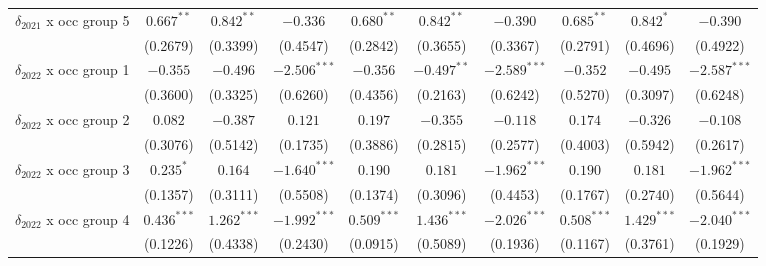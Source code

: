 \begin{tabular}{l|ccc|ccc|ccc|}
$\delta_{2021}$ x occ group 5          &            $0.667^{**}$ &    $0.842^{**}$ &        $-0.336$ &             $0.680^{**}$ &    $0.842^{**}$ &        $-0.390$ &             $0.685^{**}$ &       $0.842^*$ &        $-0.390$ \\
                                       &                (0.2679) &        (0.3399) &        (0.4547) &                 (0.2842) &        (0.3655) &        (0.3367) &                 (0.2791) &        (0.4696) &        (0.4922) \\
$\delta_{2022}$ x occ group 1          &                $-0.355$ &        $-0.496$ &  $-2.506^{***}$ &                 $-0.356$ &   $-0.497^{**}$ &  $-2.589^{***}$ &                 $-0.352$ &        $-0.495$ &  $-2.587^{***}$ \\
                                       &                (0.3600) &        (0.3325) &        (0.6260) &                 (0.4356) &        (0.2163) &        (0.6242) &                 (0.5270) &        (0.3097) &        (0.6248) \\
$\delta_{2022}$ x occ group 2          &                 $0.082$ &        $-0.387$ &         $0.121$ &                  $0.197$ &        $-0.355$ &        $-0.118$ &                  $0.174$ &        $-0.326$ &        $-0.108$ \\
                                       &                (0.3076) &        (0.5142) &        (0.1735) &                 (0.3886) &        (0.2815) &        (0.2577) &                 (0.4003) &        (0.5942) &        (0.2617) \\
$\delta_{2022}$ x occ group 3          &               $0.235^*$ &         $0.164$ &  $-1.640^{***}$ &                  $0.190$ &         $0.181$ &  $-1.962^{***}$ &                  $0.190$ &         $0.181$ &  $-1.962^{***}$ \\
                                       &                (0.1357) &        (0.3111) &        (0.5508) &                 (0.1374) &        (0.3096) &        (0.4453) &                 (0.1767) &        (0.2740) &        (0.5644) \\
$\delta_{2022}$ x occ group 4          &           $0.436^{***}$ &   $1.262^{***}$ &  $-1.992^{***}$ &            $0.509^{***}$ &   $1.436^{***}$ &  $-2.026^{***}$ &            $0.508^{***}$ &   $1.429^{***}$ &  $-2.040^{***}$ \\
                                       &                (0.1226) &        (0.4338) &        (0.2430) &                 (0.0915) &        (0.5089) &        (0.1936) &                 (0.1167) &        (0.3761) &        (0.1929) \\

\end{tabular}
